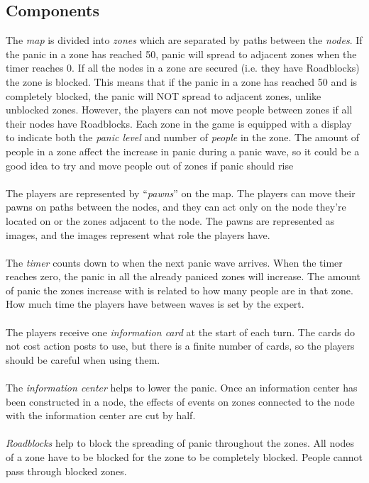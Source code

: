 \subsection*{Components}
The \emph{map} is divided into \emph{zones} which are separated by paths between the \emph{nodes}. If the panic in a zone has reached 50, panic will spread to adjacent zones when the timer reaches 0. If all the nodes in a zone are secured (i.e. they have Roadblocks) the zone is blocked. This means that if the panic in a zone has reached 50 and is completely blocked, the panic will NOT spread to adjacent zones, unlike unblocked zones. However, the players can not move people between zones if all their nodes have Roadblocks. Each zone in the game is equipped with a display to indicate both the \emph{panic level} and number of \emph{people} in the zone. The amount of people in a zone affect the increase in panic during a panic wave, so it could be a good idea to try and move people out of zones if panic should rise\\
\\
The players are represented by “\emph{pawns}” on the map. The players can move their pawns on paths between the nodes, and they can act only on the node they're located on or the zones adjacent to the node. The pawns are represented as images, and the images represent what role the players have.\\
\\
The \emph{timer} counts down to when the next panic wave arrives. When the timer reaches zero, the panic in all the already paniced zones will increase. The amount of panic the zones increase with is related to how many people are in that zone. How much time the players have between waves is set by the expert.\\
\\
The players receive one \emph{information card} at the start of each turn. The cards do not cost action posts to use, but there is a finite number of cards, so the players should be careful when using them.\\
\\
The \emph{information center} helps to lower the panic. Once an information center has been constructed in a node, the effects of events on zones connected to the node with the information center are cut by half.\\
\\
\emph{Roadblocks} help to block the spreading of panic throughout the zones. All nodes of a zone have to be blocked for the zone to be completely blocked. People cannot pass through blocked zones.\\
%
